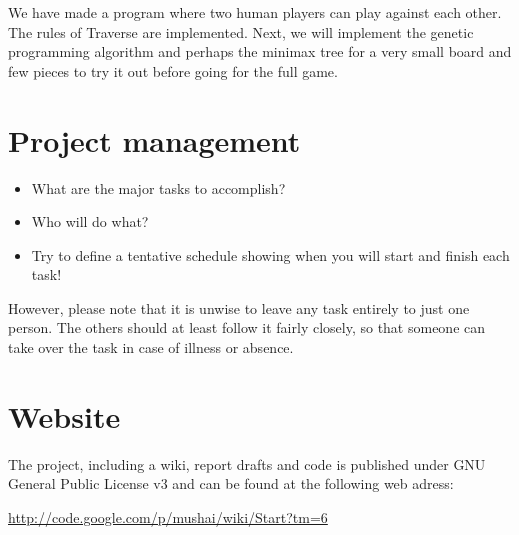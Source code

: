 \documentclass[times, 10pt,twocolumn]{article}
\begin{document}
We have made a program where two human players can play against each other. The rules of Traverse are implemented. Next, we will implement the genetic programming algorithm and perhaps the minimax tree for a very small board and few pieces to try it out before going for the full game.


\section{Project management}
\begin{itemize}
	\item{What are the major tasks to accomplish?}
	\item{Who will do what?}
	\item{Try to define a tentative schedule showing when you will start and finish each task!}
\end{itemize}
However, please note that it is unwise to leave any task entirely to just one person. The others should at least follow it fairly closely, so that someone can take over the task in case of illness or absence.

\section{Website}
The project, including a wiki, report drafts and code is published under GNU General Public License v3 and can be found at the following web adress:

\url{http://code.google.com/p/mushai/wiki/Start?tm=6}

\nocite{games_solved,course_book}


\end{document}
